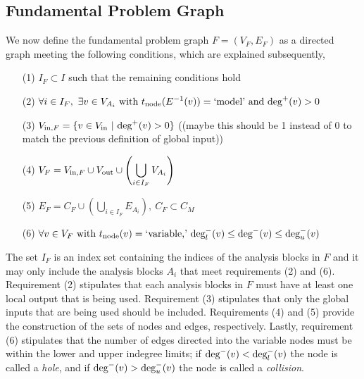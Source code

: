 \subsection{Fundamental Problem Graph}
	\label{ss:FPG}
	We now define the fundamental problem graph $F=(V_F,E_F)$ as a directed graph meeting the following conditions, which are explained subsequently,
	\begin{enumerate}
	\item[(1)] $\displaystyle{I_F \subset I}$ such that the remaining conditions hold
	\item[(2)] $\displaystyle{ \forall i \in I_F, \ \exists v \in V_{A_i} \textrm{ with } t_\textrm{node}(E^{-1}(v))=\textrm{`model'} \textrm{ and } \textrm{deg}^+(v)>0 }$
	\item[(3)] $\displaystyle{V_{\textrm{in},F} = \{v \in V_\textrm{in}  \ | \ \textrm{deg}^+(v) > 0\} }$ ((maybe this should be 1 instead of 0 to match the previous definition of global input))
	\item[(4)] $\displaystyle{V_F = V_{\textrm{in},F} \cup V_\textrm{out} \cup \left( \bigcup_{i \in I_F} V_{A_i} \right)}$
	\item[(5)] $\displaystyle{E_F = C_F \cup \left( \bigcup_{i \in I_F} E_{A_i} \right), \ C_F \subset C_M}$
	\item[(6)] $\displaystyle{\forall v \in V_F \textrm{ with } t_\textrm{node}(v) = \textrm{`variable,'} \  \textrm{deg}_l^-(v) \leq \textrm{deg}^-(v) \leq \textrm{deg}_u^-(v)}$
	\end{enumerate}
	The set $I_F$ is an index set containing the indices of the analysis blocks in $F$ and it may only include the analysis blocks $A_i$ that meet requirements (2) and (6). 
	Requirement (2) stipulates that each analysis blocks in $F$ must have at least one local output that is being used. 
	Requirement (3) stipulates that only the global inputs that are being used should be included. 
	Requirements (4) and (5) provide the construction of the sets of nodes and edges, respectively. 
	Lastly, requirement (6) stipulates that the number of edges directed into the variable nodes must be within the lower and upper indegree limits; if $\textrm{deg}^-(v) < \textrm{deg}_l^-(v)$ the node is called a \emph{hole}, and if $\textrm{deg}^-(v) > \textrm{deg}_u^-(v)$ the node is called a \emph{collision}. 

